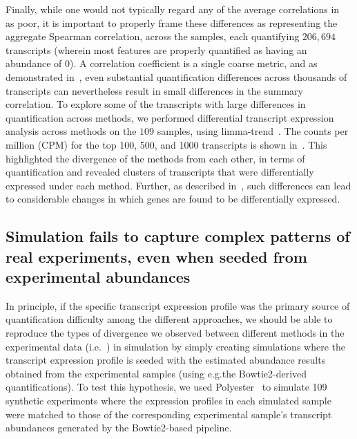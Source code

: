 Finally, while one would not typically regard any of the
  average correlations in~ as poor, it is important to properly
  frame these differences as representing the aggregate Spearman correlation,
  across the samples, each quantifying $206,694$ transcripts (wherein most
  features are properly quantified as having an abundance of $0$). A correlation
  coefficient is a single coarse metric, and as demonstrated
  in~, even substantial quantification differences
  across thousands of transcripts can nevertheless result in small differences
  in the summary correlation. To explore some of the transcripts with large differences
  in quantification across methods, we performed differential transcript
  expression analysis across methods on the $109$ samples, using
  limma-trend~\cite{law2014voom}. The counts per million (CPM) for the top 100,
  500, and 1000 transcripts is shown in~. This highlighted the
  divergence of the methods from each other, in terms of quantification and
  revealed clusters of transcripts that were differentially expressed under each
  method. Further, as described in~, such differences can lead to
  considerable changes in which genes are found to be differentially
  expressed.
  

\subsection{Simulation fails to capture complex patterns of real experiments, even when seeded from experimental abundances}
\label{subsec:sim_from_real}

In principle, if the specific transcript expression
profile was the primary source of quantification difficulty among the different approaches, we
should be able to reproduce the types of divergence we observed between
different methods in the experimental data
(i.e.~) in simulation by simply creating
simulations where the transcript expression profile is seeded with the estimated
abundance results obtained from the experimental samples (using e.g.\@ the
Bowtie2-derived quantifications).
To test this hypothesis, we used Polyester~\cite{polyester} to simulate 109
synthetic experiments where the expression profiles in each simulated sample
were matched to those of the corresponding experimental sample's transcript
abundances generated by the Bowtie2-based pipeline. 

